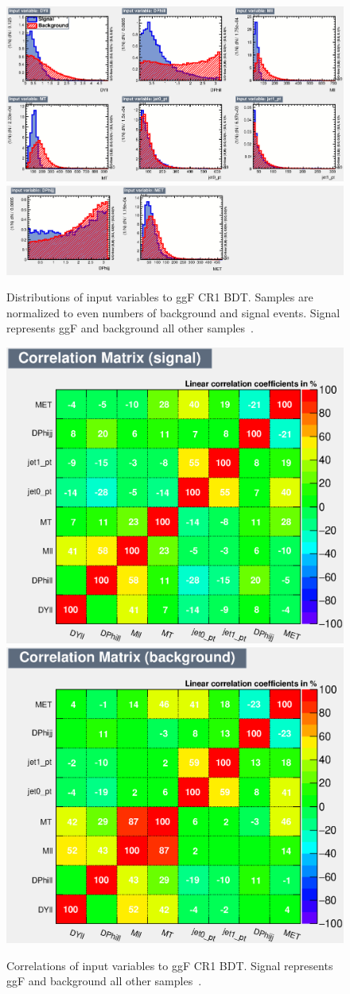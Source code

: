 \begin{figure}[!htbp]
    \centering
    \includegraphics[width=0.70\linewidth]{Pictures/ggFCR1/variables_id_c1.eps}
    \includegraphics[width=0.70\linewidth]{Pictures/ggFCR1/variables_id_c2.eps}
    \caption{Distributions of input variables to ggF CR1 BDT. Samples are normalized to even numbers of background and signal events. Signal represents ggF and background all other samples~\cite{ourSupportNote}.}
    \label{fig:ggFCR1BDTinput}
\end{figure}
\begin{figure}[!htbp]
\centering
  \includegraphics[width=.45\linewidth]{Pictures/ggFCR1/CorrelationMatrixS.eps}
  \includegraphics[width=.45\linewidth]{Pictures/ggFCR1/CorrelationMatrixB.eps}
\caption{Correlations of input variables to ggF CR1 BDT. Signal represents ggF and background all other samples~\cite{ourSupportNote}.}
\label{fig:ggFCR1corrSB}
\end{figure}

